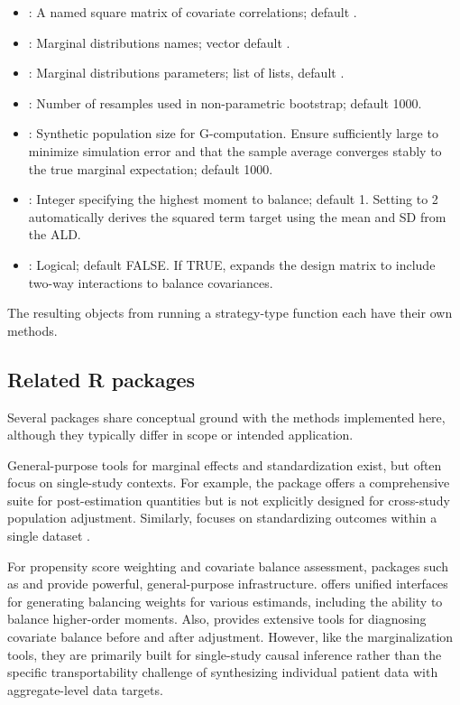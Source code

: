 \documentclass[article]{jss}
\begin{document}
\begin{itemize}
    \item {}: A named square matrix of covariate correlations; default .
    \item {}: Marginal distributions names; vector default .
    \item {}: Marginal distributions parameters; list of lists, default .
    \item {}: Number of resamples used in non-parametric bootstrap; default 1000.
    \item {}: Synthetic population size for G-computation. Ensure sufficiently large to minimize simulation error and that the sample average converges stably to the true marginal expectation; default 1000.
    \item {}: Integer specifying the highest moment to balance; default 1. Setting to 2 automatically derives the squared term target using the mean and SD from the ALD.
    \item {}: Logical; default FALSE. If TRUE, expands the design matrix to include two-way interactions to balance covariances.
\end{itemize}
The resulting objects from running a strategy-type function each have their own  methods.


\subsection{Related R packages}
Several  packages share conceptual ground with the methods implemented here, although they typically differ in scope or intended application.

General-purpose tools for marginal effects and standardization exist, but often focus on single-study contexts. For example, the  package \citep{aari_marginaleffects_2024} offers a comprehensive suite for post-estimation quantities but is not explicitly designed for cross-study population adjustment. Similarly,  focuses on standardizing outcomes within a single dataset \citep{g_sofer_2023_10022204}.

For propensity score weighting and covariate balance assessment, packages such as  \citep{greifer_weightit_2024} and  \citep{greifer_cobalt_2024} provide powerful, general-purpose infrastructure.  offers unified interfaces for generating balancing weights for various estimands, including the ability to balance higher-order moments. Also,  provides extensive tools for diagnosing covariate balance before and after adjustment. However, like the marginalization tools, they are primarily built for single-study causal inference rather than the specific transportability challenge of synthesizing individual patient data with aggregate-level data targets.
\end{document}
